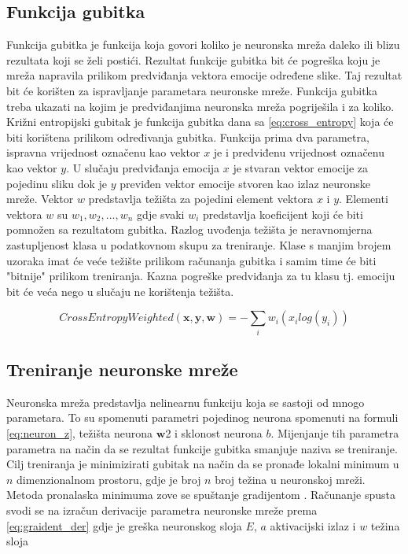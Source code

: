 \documentclass[times, utf8, zavrsni,numeric,pstricks]{fer}
\newcommand{\vect}[1]{\boldsymbol{#1}}
\begin{document}
\subsection{Funkcija gubitka}
Funkcija gubitka  je funkcija koja govori koliko je neuronska mreža daleko ili blizu rezultata koji se želi postići. Rezultat funkcije gubitka bit će pogreška koju je mreža napravila prilikom predviđanja vektora emocije određene slike. Taj rezultat bit će korišten za ispravljanje parametara neuronske mreže. Funkcija gubitka treba ukazati na kojim je predviđanjima neuronska mreža pogriješila i za koliko. Križni entropijski gubitak  je funkcija gubitka dana sa \ref{eq:cross_entropy} koja će biti korištena prilikom određivanja gubitka. Funkcija prima dva parametra, ispravna vrijednost označenu kao vektor $x$ je i predviđenu vrijednost označenu kao vektor $y$. U slučaju predviđanja emocija $x$ je stvaran vektor emocije za pojedinu sliku dok je $y$ previđen vektor emocije stvoren kao izlaz neuronske mreže. Vektor $w$ predstavlja težišta za pojedini element vektora $x$ i $y$. Elementi vektora $w$ su $w_1, w_2, ..., w_n$ gdje svaki $w_i$ predstavlja koeficijent koji će biti pomnožen sa rezultatom gubitka. Razlog uvođenja težišta je neravnomjerna zastupljenost klasa u podatkovnom skupu za treniranje. Klase s manjim brojem uzoraka imat će veće težište prilikom računanja gubitka i samim time će biti "bitnije" prilikom treniranja. Kazna pogreške predviđanja za tu klasu tj. emociju bit će veća nego u slučaju ne korištenja težišta.

\begin{equation}\label{eq:cross_entropy}
	CrossEntropyWeighted\left(\vect{x}, \vect{y},\vect{w}\right) =
		-\sum_i w_i \left( x_i log\left(y_i \right)\right)
\end{equation}

\subsection{Treniranje neuronske mreže}

Neuronska mreža predstavlja nelinearnu funkciju koja se sastoji od mnogo parametara. To su spomenuti parametri pojedinog neurona spomenuti na formuli \ref{eq:neuron_z}, težišta neurona $\vect{w}$2 i sklonost neurona $b$. Mijenjanje tih parametra parametra na način da se rezultat funkcije gubitka smanjuje naziva se treniranje. Cilj treniranja je minimizirati gubitak na način da se pronađe lokalni minimum u $n$ dimenzionalnom prostoru, gdje je broj $n$ broj težina u neuronskoj mreži. Metoda pronalaska minimuma zove se spuštanje gradijentom . Računanje spusta svodi se na izračun derivacije parametra neuronske mreže prema \ref{eq:graident_der} gdje je greška neuronskog sloja $E$, $a$ aktivacijski izlaz  i $w$ težina sloja
\end{document}
